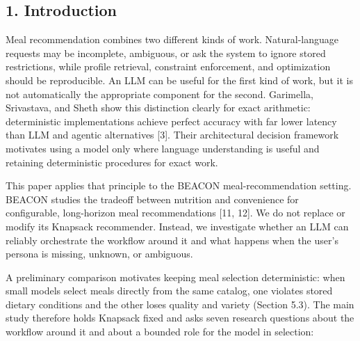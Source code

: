 \documentclass[
  10pt,
  letterpaper,
]{article}
\begin{document}
\subsection{1. Introduction}\label{introduction}

Meal recommendation combines two different kinds of work.
Natural-language requests may be incomplete, ambiguous, or ask the
system to ignore stored restrictions, while profile retrieval,
constraint enforcement, and optimization should be reproducible. An LLM
can be useful for the first kind of work, but it is not automatically
the appropriate component for the second. Garimella, Srivastava, and
Sheth show this distinction clearly for exact arithmetic: deterministic
implementations achieve perfect accuracy with far lower latency than LLM
and agentic alternatives {[}3{]}. Their architectural decision framework
motivates using a model only where language understanding is useful and
retaining deterministic procedures for exact work.

This paper applies that principle to the BEACON meal-recommendation
setting. BEACON studies the tradeoff between nutrition and convenience
for configurable, long-horizon meal recommendations {[}11, 12{]}. We do
not replace or modify its Knapsack recommender. Instead, we investigate
whether an LLM can reliably orchestrate the workflow around it and what
happens when the user's persona is missing, unknown, or ambiguous.

A preliminary comparison motivates keeping meal selection deterministic:
when small models select meals directly from the same catalog, one
violates stored dietary conditions and the other loses quality and
variety (Section 5.3). The main study therefore holds Knapsack fixed and
asks seven research questions about the workflow around it and about a
bounded role for the model in selection:
\end{document}
